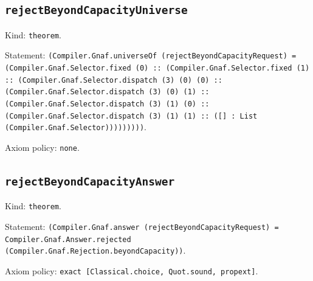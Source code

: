 \documentclass[11pt]{article}
\begin{document}
\subsection*{\texttt{rejectBeyondCapacityUniverse}}
\noindent Kind: \texttt{theorem}.\par
\noindent Statement: \texttt{(Compiler.Gnaf.universeOf (rejectBeyondCapacityRequest) = (Compiler.Gnaf.Selector.fixed (0) :: (Compiler.Gnaf.Selector.fixed (1) :: (Compiler.Gnaf.Selector.dispatch (3) (0) (0) :: (Compiler.Gnaf.Selector.dispatch (3) (0) (1) :: (Compiler.Gnaf.Selector.dispatch (3) (1) (0) :: (Compiler.Gnaf.Selector.dispatch (3) (1) (1) :: ([] : List (Compiler.Gnaf.Selector)))))))))}.\par
\noindent Axiom policy: \texttt{none}.\par
\subsection*{\texttt{rejectBeyondCapacityAnswer}}
\noindent Kind: \texttt{theorem}.\par
\noindent Statement: \texttt{(Compiler.Gnaf.answer (rejectBeyondCapacityRequest) = Compiler.Gnaf.Answer.rejected (Compiler.Gnaf.Rejection.beyondCapacity))}.\par
\noindent Axiom policy: \texttt{exact [Classical.choice, Quot.sound, propext]}.\par
\end{document}
